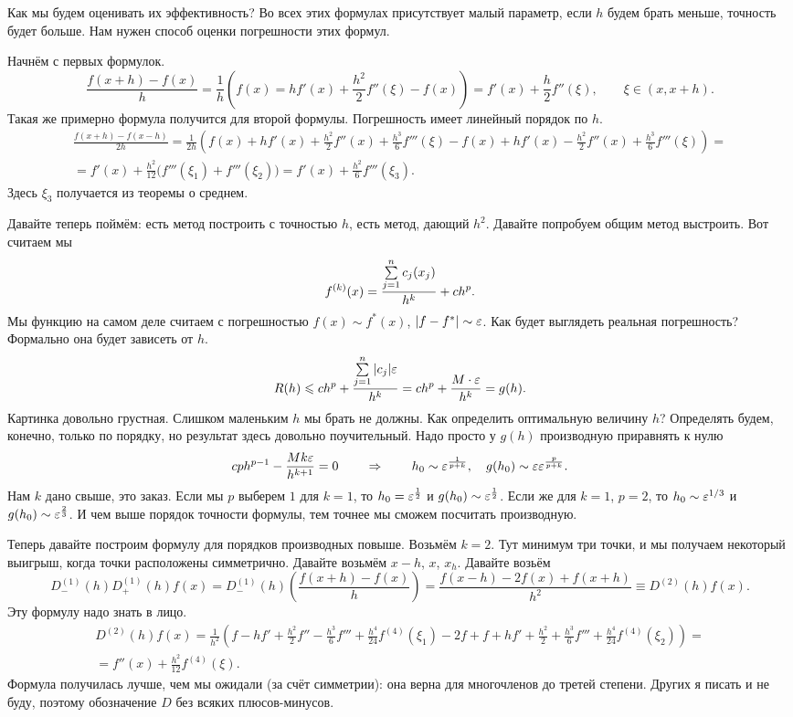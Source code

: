 Как мы будем оценивать их эффективность? Во всех этих формулах присутствует малый параметр, если $h$ будем брать меньше, точность будет больше. Нам нужен способ оценки погрешности этих формул.

Начнём с первых формулок.
\[
  \frac{f(x+h)-f(x)}{h} = \frac1h\left( f(x) = h f'(x) + \frac {h^2}2 f''(\xi) - f(x) \right) = f'(x) + \frac h2 f''(\xi),\qquad \xi \in(x,x+h).
\]
Такая же примерно формула получится для второй формулы. Погрешность имеет линейный порядок по $h$.
\begin{multline*}
  \frac{f(x+h)-f(x-h)}{2h} = \frac1{2h} \left(  f(x) + h f'(x) + \frac{h^2}2f''(x) + \frac{h^3}6 f'''(\xi) - f(x) +h f'(x) - \frac{h^2}{2} f''(x) + \frac{h^3}{6}f'''(\xi) \right) = \\=
  f'(x) + \frac{h^2}{12} \big(f'''(\xi_1) + f'''(\xi_2)\big) = f'(x) + \frac{h^2}6 f'''(\xi_3).
\end{multline*}
Здесь $\xi_3$ получается из теоремы о среднем.

Давайте теперь поймём: есть метод построить с точностью $h$, есть метод, дающий $h^2$. Давайте попробуем общим метод выстроить. Вот считаем мы 
\[
f^{(k)}(x) = \frac{\sum\limits_{j = 1}^{n} c_j (x_j)}{h^k} + c h^p.
\]
Мы функцию на самом деле считаем с погрешностью $f(x) \sim f^*(x)$, $|f-f^*|\sim \varepsilon$. Как будет выглядеть реальная погрешность? Формально она будет зависеть от $h$.
\[
  R(h) \leqslant ch^p + \frac{\sum\limits_{j = 1}^{n}|c_j|\varepsilon}{h^k} = c h^p + \frac{M\cdot \varepsilon}{h^k} = g(h).
\]
Картинка довольно грустная. Слишком маленьким $h$ мы брать не должны. Как определить оптимальную величину $h$? Определять будем, конечно, только по порядку, но результат здесь довольно поучительный.
Надо просто у $g(h)$ производную приравнять к нулю
\[
  cp h^{p-1} - \frac{ Mk\varepsilon}{h^{k+1}} = 0\qquad
  \hspace{1pt plus1pt}\Rightarrow\hspace{1pt plus1pt}\qquad
  h_0 \sim \varepsilon^{\frac1{p+k}},\quad g(h_0)\sim \varepsilon \varepsilon^{\frac p{p+k}}.
\]
Нам $k$ дано свыше, это заказ. Если мы $p$ выберем $1$ для $k=1$, то $h_0 = \varepsilon^{\frac12}$ и $g(h_0)\sim \varepsilon^{\frac12}$. Если же для $k=1$, $p=2$, то $h_0\sim \varepsilon^{1/3}$ и $g(h_0) \sim \varepsilon^{\frac23}$. И чем выше порядок точности формулы, тем точнее мы сможем посчитать производную.

Теперь давайте построим формулу для порядков производных повыше. Возьмём $k=2$. Тут минимум три точки, и мы получаем некоторый выигрыш, когда точки расположены симметрично. Давайте возьмём $x-h$, $x$, $x_h$. Давайте возьём 
\[
  D^{(1)}_-(h) D_+^{(1)}(h)f(x) = D_-^{(1)}(h)\left( \frac{f(x+h)-f(x)}{h} \right) = \frac{f(x-h) - 2f(x) + f(x+h)}{h^2}\equiv D^{(2)}(h) f(x).
\]
Эту формулу надо знать в лицо.
\begin{multline*}
  D^{(2)}(h)f(x) = \frac1{h^2}\left(  f - h f' + \frac{h^2}2 f'' - \frac{h^3}6 f''' +\frac{h^4}{24}f^{(4)}(\xi_1) - 2f + f + hf' + \frac{h^2}2 +\frac{h^3}6 f''' + \frac{h^4}{24}f^{(4)}(\xi_2) \right) = \\
 = f''(x) + \frac{h^2}{12}f^{(4)}(\xi).
\end{multline*}
Формула получилась лучше, чем мы ожидали (за счёт симметрии): она верна для многочленов до третей степени. Других я писать и не буду, поэтому обозначение $D$ без всяких плюсов-минусов.

